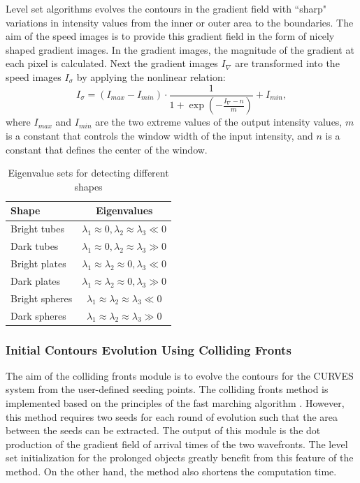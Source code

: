 Level set algorithms evolves the contours in the gradient field with ``sharp" variations in intensity values from the inner or outer area to the boundaries.
The aim of the speed images is to provide this gradient field in the form of nicely shaped gradient images.
In the gradient images, the magnitude of the gradient at each pixel is calculated.
Next the gradient images $I_{\nabla}$ are transformed into the speed images $I_{\sigma}$ by applying the nonlinear relation:
\begin{equation}
\label{eqn:Sigmoid}
I_{\sigma} = (I_{max} - I_{min}) \cdot \frac{1}{1 + \exp\left(-\frac{I_{\nabla} - n}{m}\right)} + I_{min},
\end{equation}
where $I_{max}$ and $I_{min}$ are the two extreme values of the output intensity values, $m$ is a constant that controls the window width of the input intensity, and $n$ is a constant that defines the center of the window.
\begin{table}
\renewcommand{\arraystretch}{1.3}
\caption{Eigenvalue sets for detecting different shapes}
\label{tbl:Eigenvalues}
\centering
\begin{tabular}{l||c}
\hline
\bfseries Shape & \bfseries Eigenvalues \\
\hline\hline
Bright tubes   & $\lambda_1 \approx 0, \lambda_2 \approx \lambda_3 \ll 0$ \\
Dark tubes     & $\lambda_1 \approx 0, \lambda_2 \approx \lambda_3 \gg 0$ \\
Bright plates  & $\lambda_1 \approx \lambda_2 \approx 0, \lambda_3 \ll 0$ \\
Dark plates    & $\lambda_1 \approx \lambda_2 \approx 0, \lambda_3 \gg 0$ \\
Bright spheres & $\lambda_1 \approx \lambda_2 \approx \lambda_3 \ll 0$ \\
Dark spheres   & $\lambda_1 \approx \lambda_2 \approx \lambda_3 \gg 0$ \\
\hline
\end{tabular}
\end{table}

\subsubsection{Initial Contours Evolution Using Colliding Fronts}

The aim of the colliding fronts module is to evolve the contours for the CURVES system from the user-defined seeding points.
The colliding fronts method is implemented based on the principles of the fast marching algorithm \cite{Sethian1999}.
However, this method requires two seeds for each round of evolution such that the area between the seeds can be extracted.
The output of this module is the dot production of the gradient field of arrival times of the two wavefronts.
The level set initialization for the prolonged objects greatly benefit from this feature of the method.
On the other hand, the method also shortens the computation time.

